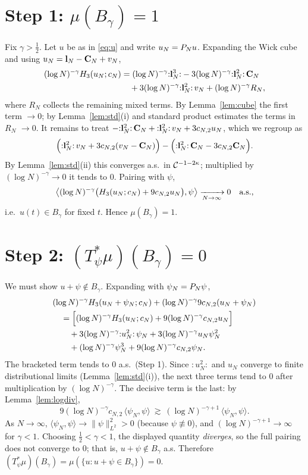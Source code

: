 \documentclass[11pt]{article}
\begin{document}
\section*{Step 1: $\mu(B_\gamma)=1$}

Fix $\gamma>\tfrac12$. Let $u$ be as in \eqref{eq:u} and write $u_N=P_N u$.
Expanding the Wick cube and using $u_N=\mathbf{l}_N-\mathbf{C}_N+v_N$,
\begin{align*}
(\log N)^{-\gamma}H_3(u_N;c_N)
&=(\log N)^{-\gamma}{:}\mathbf{l}_N^3{:}
-3(\log N)^{-\gamma}{:}\mathbf{l}_N^2{:}\,\mathbf{C}_N\\
&\quad+3(\log N)^{-\gamma}{:}\mathbf{l}_N^2{:}\,v_N
+(\log N)^{-\gamma}R_N,
\end{align*}
where $R_N$ collects the remaining mixed terms. By Lemma~\ref{lem:cube} the
first term $\to0$; by Lemma~\ref{lem:std}(i) and standard product estimates the
terms in $R_N$ $\to0$. It remains to treat
$-{:}\mathbf{l}_N^2{:}\,\mathbf{C}_N+{:}\mathbf{l}_N^2{:}\,v_N+3c_{N,2}u_N$, which we regroup as
\[
\Bigl({:}\mathbf{l}_N^2{:}\,v_N+3c_{N,2}(v_N-\mathbf{C}_N)\Bigr)-\Bigl({:}\mathbf{l}_N^2{:}\,\mathbf{C}_N-3c_{N,2}\mathbf{C}_N\Bigr).
\]
By Lemma~\ref{lem:std}(ii) this converges a.s.\ in $\mathcal{C}^{-1-2\kappa}$; multiplied
by $(\log N)^{-\gamma}\to0$ it tends to $0$. Pairing with $\psi$,
\[
\bigl\langle(\log N)^{-\gamma}\bigl(H_3(u_N;c_N)+9c_{N,2}u_N\bigr),\psi\bigr\rangle\xrightarrow[N\to\infty]{}0\quad\text{a.s.},
\]
i.e.\ $u(t)\in B_\gamma$ for fixed $t$. Hence $\mu(B_\gamma)=1$.

\section*{Step 2: $(T_\psi^*\mu)(B_\gamma)=0$}

We must show $u+\psi\notin B_\gamma$. Expanding with $\psi_N=P_N\psi$,
\begin{align*}
&(\log N)^{-\gamma}H_3(u_N+\psi_N;c_N)+(\log N)^{-\gamma}9c_{N,2}(u_N+\psi_N)\\
&\quad=\Bigl[(\log N)^{-\gamma}H_3(u_N;c_N)+9(\log N)^{-\gamma}c_{N,2}u_N\Bigr]\\
&\qquad+3(\log N)^{-\gamma}{:}u_N^2{:}\,\psi_N+3(\log N)^{-\gamma}u_N\psi_N^2\\
&\qquad+(\log N)^{-\gamma}\psi_N^3+9(\log N)^{-\gamma}c_{N,2}\psi_N.
\end{align*}
The bracketed term tends to $0$ a.s.\ (Step 1). Since ${:}u_N^2{:}$ and $u_N$
converge to finite distributional limits (Lemma~\ref{lem:std}(i)), the next three
terms tend to $0$ after multiplication by $(\log N)^{-\gamma}$. The decisive term
is the last: by Lemma~\ref{lem:logdiv},
\[
9(\log N)^{-\gamma}c_{N,2}\,\langle\psi_N,\psi\rangle\ \gtrsim\ (\log N)^{-\gamma+1}\,\langle\psi_N,\psi\rangle .
\]
As $N\to\infty$, $\langle\psi_N,\psi\rangle\to\|\psi\|_{L^2}^2>0$ (because
$\psi\not\equiv0$), and $(\log N)^{-\gamma+1}\to\infty$ for $\gamma<1$. Choosing
$\tfrac12<\gamma<1$, the displayed quantity \emph{diverges}, so the full pairing
does not converge to $0$; that is, $u+\psi\notin B_\gamma$ a.s. Therefore
$(T_\psi^*\mu)(B_\gamma)=\mu(\{u:u+\psi\in B_\gamma\})=0$.
\end{document}
